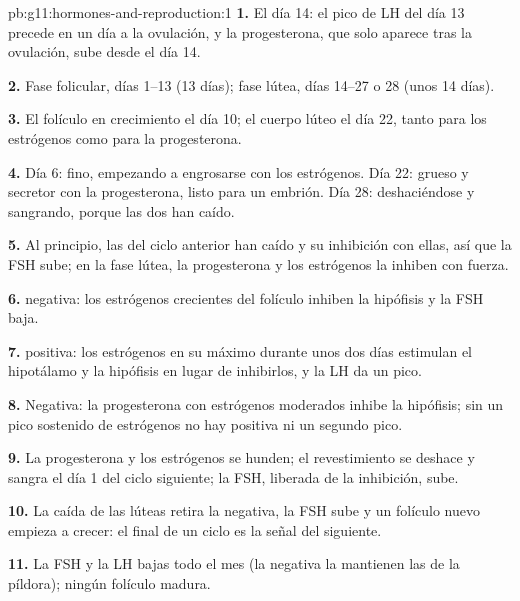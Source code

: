 \begin{solution}{pb:g11:hormones-and-reproduction:1}
\textbf{1.} El día 14: el pico de LH del día 13 precede en un día a la
ovulación, y la progesterona, que solo aparece tras la ovulación, sube
desde el día 14.

\textbf{2.} Fase folicular, días 1--13 (13 días); fase lútea, días
14--27 o 28 (unos 14 días).

\textbf{3.} El folículo en crecimiento el día 10; el cuerpo lúteo el
día 22, tanto para los estrógenos como para la progesterona.

\textbf{4.} Día 6: fino, empezando a engrosarse con los estrógenos. Día
22: grueso y secretor con la progesterona, listo para un embrión. Día
28: deshaciéndose y sangrando, porque las dos  han caído.

\textbf{5.} Al principio, las  del ciclo anterior han caído y
su inhibición con ellas, así que la FSH sube; en la fase lútea, la
progesterona y los estrógenos la inhiben con fuerza.

\textbf{6.}  negativa: los estrógenos crecientes del
folículo inhiben la hipófisis y la FSH baja.

\textbf{7.}  positiva: los estrógenos en su máximo
durante unos dos días estimulan el hipotálamo y la hipófisis en lugar
de inhibirlos, y la LH da un pico.

\textbf{8.} Negativa: la progesterona con estrógenos moderados inhibe
la hipófisis; sin un pico sostenido de estrógenos no hay
 positiva ni un segundo pico.

\textbf{9.} La progesterona y los estrógenos se hunden; el
revestimiento se deshace y sangra el día 1 del ciclo siguiente; la FSH,
liberada de la inhibición, sube.

\textbf{10.} La caída de las  lúteas retira la
 negativa, la FSH sube y un folículo nuevo empieza a
crecer: el final de un ciclo es la señal del siguiente.

\textbf{11.} La FSH y la LH bajas todo el mes (la 
negativa la mantienen las  de la píldora); ningún folículo
madura.


\end{solution}
